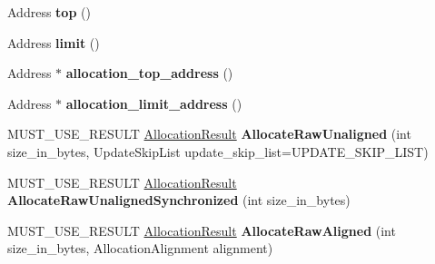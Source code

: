 \begin{DoxyCompactItemize}
\item 
Address {\bfseries top} ()\hypertarget{classv8_1_1internal_1_1_paged_space_a5c021b7494dc69658cb62083d89e59b8}{}\label{classv8_1_1internal_1_1_paged_space_a5c021b7494dc69658cb62083d89e59b8}

\item 
Address {\bfseries limit} ()\hypertarget{classv8_1_1internal_1_1_paged_space_ad626e6ec83b755db5eb3910b2c755dd0}{}\label{classv8_1_1internal_1_1_paged_space_ad626e6ec83b755db5eb3910b2c755dd0}

\item 
Address $\ast$ {\bfseries allocation\+\_\+top\+\_\+address} ()\hypertarget{classv8_1_1internal_1_1_paged_space_a7ec93f5ee2fa1bec0b7c4038f28ddc62}{}\label{classv8_1_1internal_1_1_paged_space_a7ec93f5ee2fa1bec0b7c4038f28ddc62}

\item 
Address $\ast$ {\bfseries allocation\+\_\+limit\+\_\+address} ()\hypertarget{classv8_1_1internal_1_1_paged_space_a08b69754427afe7a8621c69c85c82a32}{}\label{classv8_1_1internal_1_1_paged_space_a08b69754427afe7a8621c69c85c82a32}

\item 
M\+U\+S\+T\+\_\+\+U\+S\+E\+\_\+\+R\+E\+S\+U\+LT \hyperlink{classv8_1_1internal_1_1_allocation_result}{Allocation\+Result} {\bfseries Allocate\+Raw\+Unaligned} (int size\+\_\+in\+\_\+bytes, Update\+Skip\+List update\+\_\+skip\+\_\+list=U\+P\+D\+A\+T\+E\+\_\+\+S\+K\+I\+P\+\_\+\+L\+I\+ST)\hypertarget{classv8_1_1internal_1_1_paged_space_aed0b55e63b6f324531b20bf9d29cdee1}{}\label{classv8_1_1internal_1_1_paged_space_aed0b55e63b6f324531b20bf9d29cdee1}

\item 
M\+U\+S\+T\+\_\+\+U\+S\+E\+\_\+\+R\+E\+S\+U\+LT \hyperlink{classv8_1_1internal_1_1_allocation_result}{Allocation\+Result} {\bfseries Allocate\+Raw\+Unaligned\+Synchronized} (int size\+\_\+in\+\_\+bytes)\hypertarget{classv8_1_1internal_1_1_paged_space_a9e11e78fcd71b9b67e17c4ce63a43fd1}{}\label{classv8_1_1internal_1_1_paged_space_a9e11e78fcd71b9b67e17c4ce63a43fd1}

\item 
M\+U\+S\+T\+\_\+\+U\+S\+E\+\_\+\+R\+E\+S\+U\+LT \hyperlink{classv8_1_1internal_1_1_allocation_result}{Allocation\+Result} {\bfseries Allocate\+Raw\+Aligned} (int size\+\_\+in\+\_\+bytes, Allocation\+Alignment alignment)\hypertarget{classv8_1_1internal_1_1_paged_space_ae04e88837c5f6b417acc679a89707b93}{}\label{classv8_1_1internal_1_1_paged_space_ae04e88837c5f6b417acc679a89707b93}


\end{DoxyCompactItemize}
